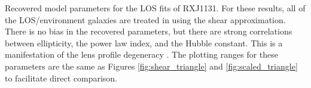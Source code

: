 \label{fig:los_triangle} Recovered model parameters for the LOS fits of RXJ1131. For these results, all of the LOS/environment galaxies are treated in using the shear approximation. There is no bias in the recovered parameters, but there are strong correlations between ellipticity, the power law index, and the Hubble constant. This is a manifestation of the lens profile degeneracy \citep{Kochanek02}. The plotting ranges for these parameters are the same as Figures \ref{fig:shear_triangle} and \ref{fig:scaled_triangle} to facilitate direct comparison.